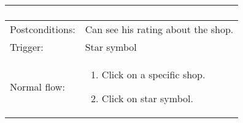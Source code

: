 \begin{longtable}{| p{3.5cm} | p{9cm} |}
\begin{enumerate}
\end{enumerate}\\
\hline
Postconditions: & Can see his rating about the shop. \\
\hline
Trigger: & Star symbol\\
\hline
Normal flow: &\mbox{}\par\vspace{-\baselineskip}
\begin{enumerate}
\item Click on a specific shop.
\item Click on star symbol.
\end{enumerate}\\
\hline
\end{longtable}

